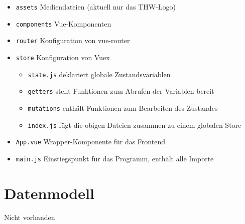 \documentclass[a4paper,11pt,oneside, titlepage]{article}
\begin{document}
  \newpage


    \begin{itemize}
      \item \verb+assets+ Mediendateien (aktuell nur das THW-Logo)
      \item \verb+components+ Vue-Komponenten
      \item \verb+router+ Konfiguration von vue-router
      \item \verb+store+ Konfiguration von Vuex
        \begin{itemize}
          \item \verb+state.js+ deklariert globale Zustandsvariablen
          \item \verb+getters+ stellt Funktionen zum Abrufen der Variablen bereit
          \item \verb+mutations+ enthält Funktionen zum Bearbeiten des Zustandes
          \item \verb+index.js+ fügt die obigen Dateien zusammen zu einem globalen Store
        \end{itemize}
      \item \verb+App.vue+ Wrapper-Komponente für das Frontend
      \item \verb+main.js+ Einstiegspunkt für das Programm, enthält alle Importe
    \end{itemize}

\begin{minipage}{16cm}
\end{minipage}



\section{Datenmodell}
Nicht vorhanden


  

  \newpage

  \printglossaries
\end{document}
